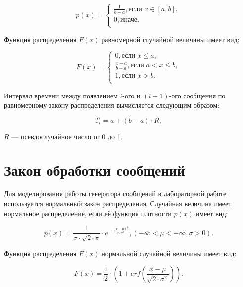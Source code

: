 \begin{equation}
    p(x) = 
    \begin{cases}
        \frac{1}{b - a}, \text{если } x \in [a, b],\\
        0, \text{иначе.} \\
    \end{cases}
\end{equation}

Функция распределения $F(x)$ равномерной случайной величины имеет вид:

\begin{equation}
    F(x) = 
    \begin{cases}
    		0, \text{если } x \leqslant a, \\
        \frac{x - a}{b - a}, \text{если } a < x \leqslant b,\\
        1, \text{если } x > b. \\
    \end{cases}
\end{equation}

Интервал времени между появлением $i$-ого и $(i - 1)$-ого сообщения по равномерному закону распределения вычисляется следующим образом:

\begin{equation}
	T_{i} = a + (b - a) \cdot R,
\end{equation}

 $R$ --- псевдослучайное число от 0 до 1.

\section{Закон обработки сообщений}

Для моделирования работы генератора сообщений в лабораторной работе используется нормальный закон распределения. Случайная величина имеет нормальное распределение, если её функция плотности $p(x)$ имеет вид:

\begin{equation}
    p(x) = \frac{1}{\sigma \cdot \sqrt{2 \cdot \pi}} \cdot e^{-\frac{(x - \mu)^2}{2 \cdot \sigma^2}}, (-\infty < \mu < +\infty, \sigma > 0).
\end{equation}

Функция распределения $F(x)$ нормальной случайной величины имеет вид:

\begin{equation}
    F(x) = \frac{1}{2} \cdot (1 + erf(\frac{x - \mu}{\sqrt{2 \cdot \sigma^2}})).
\end{equation}

